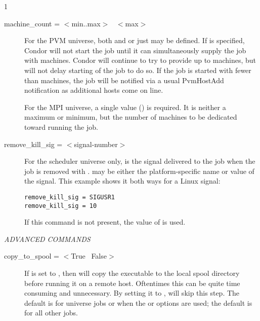 \begin{ManPage}{\label{man-condor-submit}}{1}
\begin{description}

\item[machine\_count = $<$min..max$>$ \Bar\ $<$max$>$] 
For the PVM universe,
both  and  or just
 may be defined. 
If  is
specified, Condor will not start the job until it can simultaneously
supply the job with  machines.  Condor will continue to try 
to provide up
to  machines, but will not delay starting of the job to do so.
If the job is started with fewer than  machines, the job
will be notified via a usual PvmHostAdd notification as additional
hosts come on line.

For the MPI universe, a single value () is required.
It is neither a maximum or minimum, but 
the number of machines to be dedicated toward running the job.


\item[remove\_kill\_sig = $<$signal-number$>$] For the scheduler universe only,
 is the signal delivered
to the job when the job is removed
with .
 may be either the platform-specific name or value
of the signal.
This example shows it both ways for a Linux signal:
\begin{verbatim}
remove_kill_sig = SIGUSR1
remove_kill_sig = 10
\end{verbatim}
If this command is not present,
the value of  is used.

\end{description} 

\emph{ADVANCED COMMANDS}
\begin{description} 


\item[copy\_to\_spool = $<$True \Bar\ False$>$] If  is set to
, then  will copy the executable to the local spool 
directory before running it on a remote host. Oftentimes this can be quite
time consuming and unnecessary. By setting it to , 
will skip this step. The default is  for  universe jobs
or when the  or  options are used; the default is  for
all other jobs.


\end{description}
\end{ManPage}
